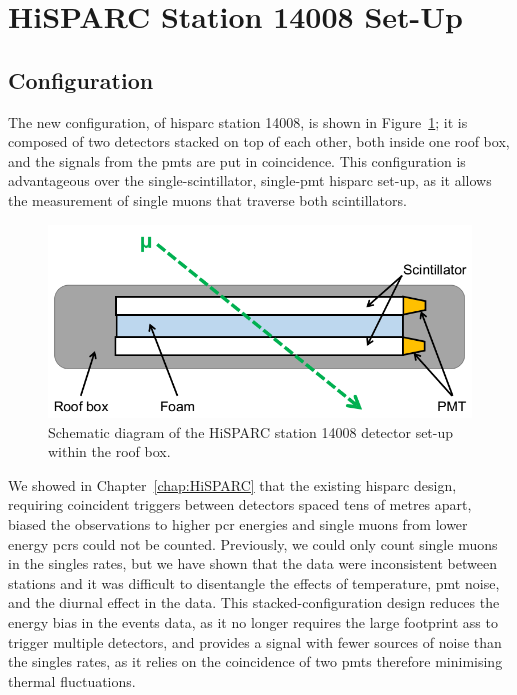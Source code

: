 \section{HiSPARC Station 14008 Set-Up}\label{sec:HiSPARC_14008}


\subsection{Configuration}

The new configuration, of \gls{hisparc} station 14008, is shown in Figure~\ref{fig:14008_config}; it is composed of two detectors stacked on top of each other, both inside one roof box, and the signals from the \glspl{pmt} are put in coincidence. This configuration is advantageous over the single-scintillator, single-\gls{pmt} \gls{hisparc} set-up, as it allows the measurement of single muons that traverse both scintillators. 


\begin{figure}[ht!]
	\center
	\includegraphics[width=0.75\columnwidth]{14008_config.png}
	\caption{Schematic diagram of the HiSPARC station 14008 detector set-up within the roof box.}
	\label{fig:14008_config}
\end{figure}

We showed in Chapter~\ref{chap:HiSPARC} that the existing \gls{hisparc} design, requiring coincident triggers between detectors spaced tens of metres apart, biased the observations to higher \gls{pcr} energies and single muons from lower energy \glspl{pcr} could not be counted. Previously, we could only count single muons in the singles rates, but we have shown that the data were inconsistent between stations and it was difficult to disentangle the effects of temperature, \gls{pmt} noise, and the diurnal effect in the data. This stacked-configuration design reduces the energy bias in the events data, as it no longer requires the large footprint \glspl{as} to trigger multiple detectors, and provides a signal with fewer sources of noise than the singles rates, as it relies on the coincidence of two \glspl{pmt} therefore minimising thermal fluctuations.

